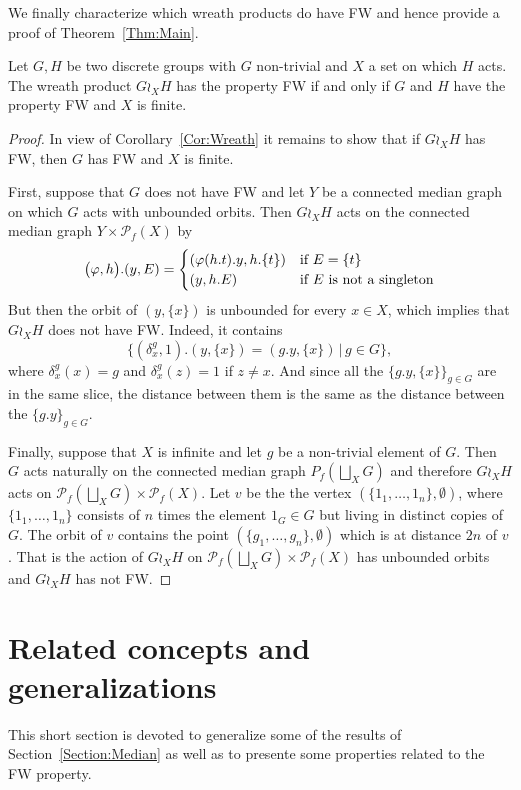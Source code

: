 We finally characterize which wreath products do have FW and hence provide a proof of Theorem~\ref{Thm:Main}.
\begin{prop}\label{Prop:Median}
Let $G,H$ be two discrete groups with $G$ non-trivial and $X$ a set on which $H$ acts. The wreath product $G \wr_X H$ has the property FW if and only if $G$ and $H$ have the property FW and $X$ is finite.
\end{prop}
\begin{proof}
In view of Corollary~\ref{Cor:Wreath} it remains to show that if $G\wr_X H$ has FW, then $G$ has FW and $X$ is finite.

First, suppose that $G$ does not have FW and let $Y$ be a connected median graph on which $G$ acts with unbounded orbits.
Then $G\wr_X H$ acts on the connected median graph $Y\times \mathcal P_f(X)$ by
\[
	\bigl(\phi,h\bigr).(y,E)=
	\begin{cases}
	(\phi(h.t).y,h.\{t\})&\textnormal{if $E=\{t\}$}\\
	(y,h.E)&\textnormal{if $E$ is not a singleton}
	\end{cases}
\]
But then the orbit of $(y,\{x\})$ is unbounded for every $x\in X$, which implies that $G\wr_X H$ does not have FW.
Indeed, it contains
\[
	\{(\delta_{x}^g,1).(y,\{x\})=(g.y,\{x\})\,|\,g\in G\},
\]
where $\delta_{x}^g(x)=g$ and $\delta_{x}^g(z)=1$ if $z\neq x$. 
And since all the $\{g.y,\{x\}\}_{g\in G}$ are in the same slice, the distance between them is the same as the distance between the $\{g.y\}_{g\in G}$.

Finally, suppose that $X$ is infinite and let $g$ be a non-trivial element of $G$.
Then $G$ acts naturally on the connected median graph $P_f(\bigsqcup_XG)$ and therefore $G\wr_X H$ acts on $\mathcal P_f(\bigsqcup_XG)\times \mathcal P_f(X)$.
Let $v$ be the the vertex $(\{1_1,\dots, 1_n\},\emptyset)$, where $\{1_1,\dots, 1_n\}$ consists of $n$ times the element $1_G\in G$ but living in distinct copies of $G$.
The orbit of $v$ contains the point $(\{g_1,\dots, g_n\},\emptyset)$ which is at distance $2n$ of $v$.
That is the action of $G\wr_X H$ on $\mathcal P_f(\bigsqcup_XG)\times \mathcal P_f(X)$ has unbounded orbits and $G\wr_X H$ has not FW.
\end{proof}






\section{Related concepts and generalizations}\label{Section:Generalizations}
This short section is devoted to generalize some of the results of Section~\ref{Section:Median} as well as to presente some properties related to the FW property.

